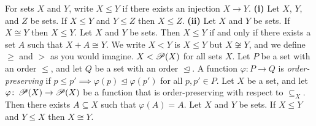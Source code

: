  For sets $X$ and $Y$, write $X \leq Y$ if there exists an injection $X \to Y$.
 \textbf{(i)} Let $X$, $Y$, and $Z$ be sets. If $X \leq Y$ and $Y \leq Z$ then $X \leq Z$. \textbf{(ii)} Let $X$ and $Y$ be sets. If $X \cong Y$ then $X \leq Y$.
 Let $X$ and $Y$ be sets. Then $X \leq Y$ if and only if there exists a set $A$ such that $X + A \cong Y$.
 We write $X < Y$ is $X \leq Y$ but $X \not \cong Y$, and we define $\geq$ and $>$ as you would imagine.
 $X < \operatorname{\mathscr{P}}(X)$ for all sets $X$.
 Let $P$ be a set with an order $\leq$, and let $Q$ be a set with an order $\trianglelefteq$. A function $\varphi \colon P \to Q$ is \textit{order-preserving} if $p \leq p' \implies \varphi(p) \trianglelefteq \varphi(p')$ for all $p, p' \in P$.
 Let $X$ be a set, and let $\varphi \colon \operatorname{\mathscr{P}}(X) \to \operatorname{\mathscr{P}}(X)$ be a function that is order-preserving with respect to $\subseteq_X$. Then there exists $A \subseteq X$ such that $\varphi(A) = A$.
 Let $X$ and $Y$ be sets. If $X \leq Y$ and $Y \leq X$ then $X \cong Y$.
